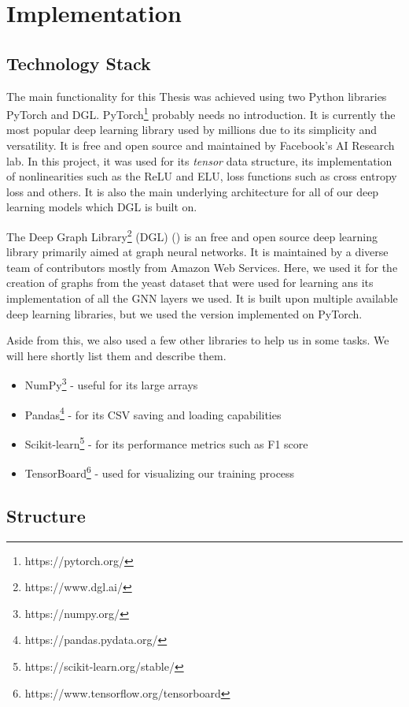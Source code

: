 \documentclass[times, utf8, diplomski, english]{fer_eng}
\begin{document}
\chapter{Implementation}

\section{Technology Stack}

The main functionality for this Thesis was achieved using two Python libraries PyTorch and DGL. PyTorch\footnote{https://pytorch.org/} probably needs no introduction. It is currently the most popular deep learning library used by millions due to its simplicity and versatility. It is free and open source and maintained by Facebook's AI Research lab. In this project, it was used for its \textit{tensor} data structure, its implementation of nonlinearities such as the ReLU and ELU, loss functions such as cross entropy loss and others. It is also the main underlying architecture for all of our deep learning models which DGL is built on.

The Deep Graph Library\footnote{https://www.dgl.ai/} (DGL) (\cite{DGL}) is an free and open source deep learning library primarily aimed at graph neural networks. It is maintained by a diverse team of contributors mostly from Amazon Web Services. Here, we used it for the creation of graphs from the yeast dataset that were used for learning ans its implementation of all the GNN layers we used. It is built upon multiple available deep learning libraries, but we used the version implemented on PyTorch.

Aside from this, we also used a few other libraries to help us in some tasks. We will here shortly list them and describe them.

\begin{itemize}
	\item NumPy\footnote{https://numpy.org/} - useful for its large arrays
	\item Pandas\footnote{https://pandas.pydata.org/} - for its CSV saving and loading capabilities
	\item Scikit-learn\footnote{https://scikit-learn.org/stable/} - for its performance metrics such as F1 score
	\item TensorBoard\footnote{https://www.tensorflow.org/tensorboard} - used for visualizing our training process
\end{itemize}

\section{Structure}
\end{document}
